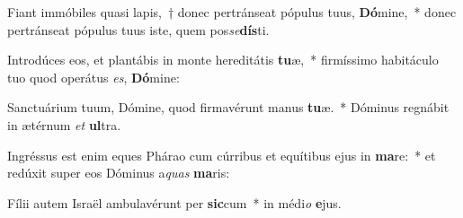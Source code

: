 \item Fiant immóbiles quasi lapis,~† donec pertránseat pópulus tuus, \textbf{Dó}mine,~* donec pertránseat pópulus tuus iste, quem pos\textit{se}\textbf{dís}ti.
\item Introdúces eos, et plantábis in monte hereditátis \textbf{tu}æ,~* firmíssimo habitáculo tuo quod operátus \textit{es}, \textbf{Dó}mine:
\item Sanctuárium tuum, Dómine, quod firmavérunt manus \textbf{tu}æ.~* Dóminus regnábit in ætérnum \textit{et} \textbf{ul}tra.
\item Ingréssus est enim eques Phárao cum cúrribus et equítibus ejus in \textbf{ma}re:~* et redúxit super eos Dóminus a\textit{quas} \textbf{ma}ris:
\item Fílii autem Israël ambulavérunt per \textbf{sic}cum~* in médi\textit{o} \textbf{e}jus.
